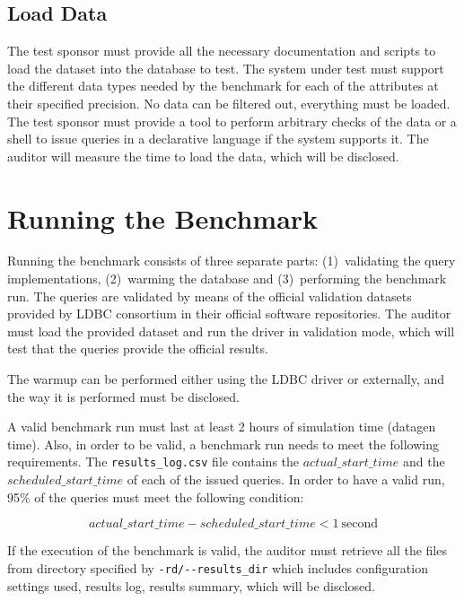 \subsection{Load Data}

The test sponsor must provide all the necessary documentation and scripts
to load the dataset into the database to test. The system under test must
support the different data types needed by the benchmark for each of the
attributes at their specified precision. No data can be filtered out, everything
must be loaded.  The test sponsor must provide a tool to perform arbitrary
checks of the data or a shell to issue queries in a declarative language if the
system supports it. The auditor will measure the time to load the data, which
will be disclosed.

\section{Running the Benchmark}

Running the benchmark consists of three separate parts: (1)~validating the query
implementations, (2)~warming the database and (3)~performing the benchmark run. The
queries are validated by means of the official validation datasets provided by
LDBC consortium in their official software repositories. The auditor must load
the provided dataset and run the driver in validation mode, which will test
that the queries provide the official results.

The warmup can be performed either using the LDBC driver or externally, and the
way it is performed must be disclosed.

A valid benchmark run must last at least 2 hours of simulation time (datagen
time).  Also, in order to be valid, a benchmark run needs to meet the following
requirements. The \texttt{results\_log.csv} file contains the $\mathit{actual\_start\_time}$ and the $\mathit{scheduled\_start\_time}$ of each of the issued queries.  In order to have a valid
run, 95\% of the queries must meet the following condition:

\begin{equation*}
\mathit{actual\_start\_time} - \mathit{scheduled\_start\_time} < 1\
\mathrm{second}
\end{equation*}

If the execution of the benchmark is valid, the auditor must retrieve all the
files from directory specified by \verb|-rd/--results_dir| which includes
configuration settings used, results log, results summary, which will be
disclosed.

